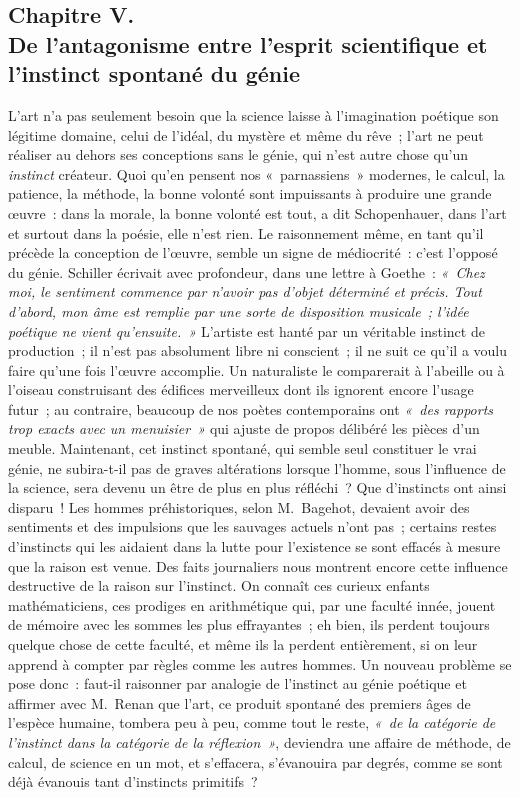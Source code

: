 \documentclass[french,twoside]{book} %
\begin{document}
\subsection[{Chapitre V. De l’antagonisme entre l’esprit scientifique et l’instinct spontané du génie}]{Chapitre V. \\
De l’antagonisme entre l’esprit scientifique et l’instinct spontané du génie}
\noindent  L’art n’a pas seulement besoin que la science laisse à l’imagination poétique son légitime domaine, celui de l’idéal, du mystère et même du rêve ; l’art ne peut réaliser au dehors ses conceptions sans le génie, qui n’est autre chose qu’un \emph{instinct} créateur. Quoi qu’en pensent nos « parnassiens » modernes, le calcul, la patience, la méthode, la bonne volonté sont impuissants à produire une grande œuvre : dans la morale, la bonne volonté est tout, a dit Schopenhauer, dans l’art et surtout dans la poésie, elle n’est rien. Le raisonnement même, en tant qu’il précède la conception de l’œuvre, semble un signe de médiocrité : c’est l’opposé du génie. Schiller écrivait avec profondeur, dans une lettre à Goethe : \emph{« Chez moi, le sentiment commence par n’avoir pas d’objet déterminé et précis. Tout d’abord, mon âme est remplie par une sorte de disposition musicale ; l’idée poétique ne vient qu’ensuite. »} L’artiste est hanté par un véritable instinct de production ; il n’est pas absolument libre ni conscient ; il ne suit ce qu’il a voulu  faire qu’une fois l’œuvre accomplie. Un naturaliste le comparerait à l’abeille ou à l’oiseau construisant des édifices merveilleux dont ils ignorent encore l’usage futur ; au contraire, beaucoup de nos poètes contemporains ont \emph{« des rapports trop exacts avec un menuisier »} qui ajuste de propos délibéré les pièces d’un meuble. Maintenant, cet instinct spontané, qui semble seul constituer le vrai génie, ne subira-t-il pas de graves altérations lorsque l’homme, sous l’influence de la science, sera devenu un être de plus en plus réfléchi ? Que d’instincts ont ainsi disparu ! Les hommes préhistoriques, selon M. Bagehot, devaient avoir des sentiments et des impulsions que les sauvages actuels n’ont pas ; certains restes d’instincts qui les aidaient dans la lutte pour l’existence se sont effacés à mesure que la raison est venue. Des faits journaliers nous montrent encore cette influence destructive de la raison sur l’instinct. On connaît ces curieux enfants mathématiciens, ces prodiges en arithmétique qui, par une faculté innée, jouent de mémoire avec les sommes les plus effrayantes ; eh bien, ils perdent toujours quelque chose de cette faculté, et même ils la perdent entièrement, si on leur apprend à compter par règles comme les autres hommes. Un nouveau problème se pose donc : faut-il raisonner par analogie de l’instinct au génie poétique et affirmer avec M. Renan que l’art, ce produit spontané des premiers âges de l’espèce humaine, tombera peu à peu, comme tout le reste, \emph{« de la catégorie de l’instinct dans la catégorie de la réflexion »}, deviendra une affaire de méthode, de calcul, de science en un mot, et s’effacera, s’évanouira  par degrés, comme se sont déjà évanouis tant d’instincts primitifs ?\par
\end{document}
